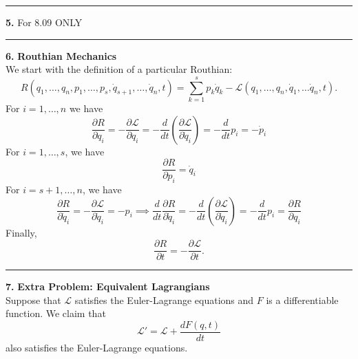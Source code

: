 \documentclass{article}
\theoremstyle{definition}
\newcommand{\p}{\partial}
\newcommand{\lag}{\mathcal{L}}
\newcommand{\f}[2]{\frac{#1}{#2}}
\newcommand{\lp}{\left(}
\newcommand{\rp}{\right)}
\begin{document}
\hrule

$\,$\\


\noindent \textbf{5.} For 8.09 ONLY\\


\hrule

$\,$\\


\noindent \textbf{6.} \textbf{Routhian Mechanics}\\


\noindent We start with the definition of a particular Routhian:
\begin{equation*}
R(q_1,\dots,q_n, p_1,\dots,p_s, \dot{q}_{s+1}, \dots, \dot{q}_{n},t) = \sum^s_{k=1} p_k \dot{q}_k  - \lag(q_1,\dots,q_n, \dot{q}_1,\dots \dot{q}_n,t).
\end{equation*}
For $i = 1,\dots,n$ we have
\begin{equation*}
\boxed{\f{\p R}{\p q_i}} = -\f{\p \lag}{\p q_i} = -\f{d}{dt} \lp \f{\p \lag}{\p \dot{q}_i} \rp = -\f{d}{dt}p_i = \boxed{-\dot{p}_i}
\end{equation*}
For $i=1,\dots,s$, we have
\begin{equation*}
\boxed{\f{\p R}{\p p_i} = \dot{q}_i}
\end{equation*}
For $i = s+1,\dots,n$, we have 
\begin{equation*}
\boxed{\f{\p R}{\p \dot{q}_i}} = -\f{\p \lag}{\p \dot{q}_i} = \boxed{-p_i} \implies \boxed{\f{d}{dt}\f{\p R}{\p \dot{q}_i}} = -\f{d}{dt}\lp \f{\p \lag}{\p \dot{q}_i} \rp = -\f{d}{dt} p_i = \boxed{\f{\p R}{\p q_i}}
\end{equation*}
Finally, 
\begin{equation*}
\f{\p R}{\p t} = -\f{\p \lag}{\p t}.
\end{equation*}



\hrule

$\,$\\


\noindent \textbf{7.} \textbf{Extra Problem: Equivalent Lagrangians}\\


\noindent Suppose that $\lag$ satisfies the Euler-Lagrange equations and $F$ is a differentiable function. We claim that
\begin{equation*}
\lag' = \lag + \f{dF(q,t)}{dt}
\end{equation*}
also satisfies the Euler-Lagrange equations.
\end{document}
